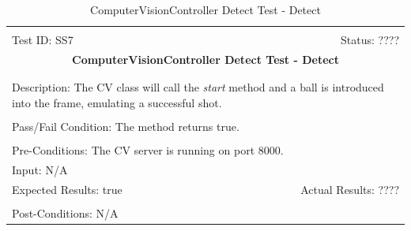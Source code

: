 \documentclass[11pt]{article}
\begin{document}
\begin{center}
\begin{table}[H]
\begin{tabular}{|l r|}\hline&\\[-2mm]
	Test ID: SS7	&Status: ????\\[-3mm]
	\multicolumn{2}{|c|}{\textbf{\large{ComputerVisionController Detect Test - Detect}}}\\&\\\hline&\\[-3mm]
	\multicolumn{2}{|p{\textwidth}|}{Description: The CV class will call the \textit{start} method and a ball is introduced into the frame, emulating a successful shot.}\\[1mm]\hline&\\[-3mm]
	\multicolumn{2}{|p{\textwidth}|}{Pass/Fail Condition: The method returns true.}\\[1mm]\hline&\\[-3mm]
	\multicolumn{2}{|p{\textwidth}|}{Pre-Conditions: The CV server is running on port 8000.}\\[4mm]
	\multicolumn{2}{|p{\textwidth}|}{Input: N/A}\\[2mm]\hline
	\multicolumn{1}{|p{0.49\textwidth}}{Expected Results: true}	&\multicolumn{1}{|p{0.45\textwidth}|}{Actual Results: ????}\\\hline&\\[-3mm]
	\multicolumn{2}{|p{\textwidth}|}{Post-Conditions: N/A}\\\hline
\end{tabular}
\caption{ComputerVisionController Detect Test - Detect}
\end{table}
\end{center}
\end{document}

